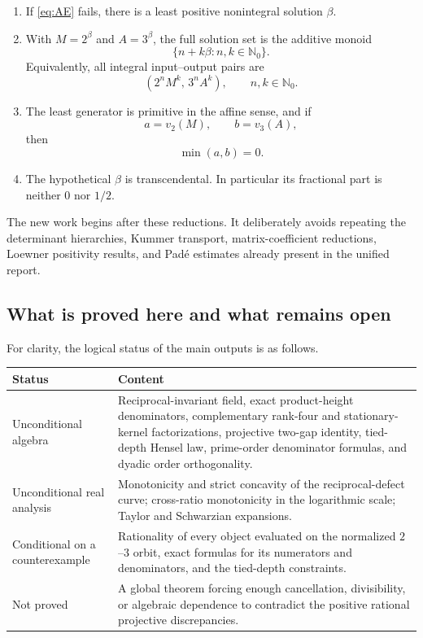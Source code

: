 \documentclass[11pt]{article}
\theoremstyle{definition}
\theoremstyle{remark}
\newcommand{\N}{\mathbb{N}}
\begin{document}
\begin{enumerate}
\item If \eqref{eq:AE} fails, there is a least positive nonintegral solution $\beta$.
\item With $M=2^\beta$ and $A=3^\beta$, the full solution set is the additive monoid
\[
 \{n+k\beta:n,k\in\N_0\}.
\]
Equivalently, all integral input--output pairs are
\[
 (2^nM^k,\,3^nA^k),\qquad n,k\in\N_0.
\]
\item The least generator is primitive in the affine sense, and if
\[
 a=v_2(M),\qquad b=v_3(A),
\]
then
\begin{equation}\label{eq:min-depth-zero}
 \min(a,b)=0.
\end{equation}
\item The hypothetical $\beta$ is transcendental.  In particular its fractional part is neither $0$ nor $1/2$.
\end{enumerate}

The new work begins after these reductions.  It deliberately avoids repeating the determinant hierarchies, Kummer transport, matrix-coefficient reductions, Loewner positivity results, and Pad\'e estimates already present in the unified report.

\subsection{What is proved here and what remains open}

For clarity, the logical status of the main outputs is as follows.

\begin{center}
\begin{tabularx}{0.96\textwidth}{@{}>{\raggedright\arraybackslash}p{}X@{}}
\toprule
Status & Content \\
\midrule
Unconditional algebra & Reciprocal-invariant field, exact product-height denominators, complementary rank-four and stationary-kernel factorizations, projective two-gap identity, tied-depth Hensel law, prime-order denominator formulas, and dyadic order orthogonality. \\
Unconditional real analysis & Monotonicity and strict concavity of the reciprocal-defect curve; cross-ratio monotonicity in the logarithmic scale; Taylor and Schwarzian expansions. \\
Conditional on a counterexample & Rationality of every object evaluated on the normalized $2$--$3$ orbit, exact formulas for its numerators and denominators, and the tied-depth constraints. \\
Not proved & A global theorem forcing enough cancellation, divisibility, or algebraic dependence to contradict the positive rational projective discrepancies. \\
\bottomrule
\end{tabularx}
\end{center}
\end{document}
